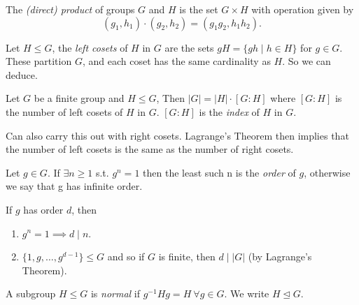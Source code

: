 \begin{definition}
The \textit{(direct) product} of groups \(G\) and \(H\) is the set \(G\times H\) with operation given by
\[
    (g_1, h_1) \cdot (g_2, h_2) = (g_1 g_2, h_1 h_2).
\] 
\end{definition}

Let \(H \leq G\), the \textit{left cosets} of \(H\) in \(G\) are the sets \(gH = \{gh\mid h \in H\}\) for \(g \in G\). These partition \(G\), and each coset has the same cardinality as \(H\). So we can deduce.

\begin{theorem}
    Let \(G\) be a finite group and \(H \leq  G\), Then \(\left\vert G \right\vert = \left\vert H \right\vert \cdot [G:H]\) where \([G:H]\) is the number of left cosets of \(H\) in \(G\). \([G:H]\) is the \textit{index} of \(H\) in \(G\).
\end{theorem}

\begin{remark}
    Can also carry this out with right cosets. Lagrange's Theorem then implies that the number of left cosets is the same as the number of right cosets.
\end{remark}

\begin{definition}[Order]
    Let \(g \in G\). If \(\exists n \geq  1\) s.t. \(g^n = 1\) then the least such n is the \textit{order} of \(g\), otherwise we say that g has infinite order.
\end{definition}

\begin{remark}
    If \(g\) has order \(d\), then
    \begin{enumerate}
        \item \(g^{n} = 1 \implies d \mid n\).
        \item \(\{1,g, \ldots , g^{d-1}\} \leq G\) and so if \(G\) is finite, then \(d\mid \left\vert G \right\vert \) (by Lagrange's Theorem).
    \end{enumerate}
\end{remark}

\begin{definition}
    A subgroup \(H \leq  G\) is \textit{normal} if \(g^{-1}Hg = H~\forall g \in G\). We write \(H \trianglelefteq G\).
\end{definition}


